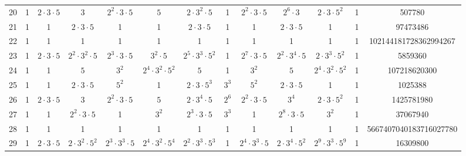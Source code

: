 \begin{table}
\begin{center}
\begin{adjustbox}{max width=\textwidth}
\begin{tabular}{|c|ccccccccccc|c|}
20& 1& $2\cdot 3\cdot 5$& $3$& $2^2\cdot 3\cdot 5$& $5$& $2\cdot 3^2\cdot 5$&1& $2^2\cdot 3\cdot 5$& $2^6\cdot 3$& $2\cdot 3\cdot 5^2$&1&507780\\
21& 1&1& $2\cdot 3\cdot 5$&1&1& $2\cdot 3\cdot 5$&1&1& $2\cdot 3\cdot 5$&1&1&97473486\\
22& 1&1&1&1&1&1&1&1&1&1&1&102144181728362994267\\
23& 1& $2\cdot 3\cdot 5$& $2^2\cdot 3^2\cdot 5$& $2^3\cdot 3\cdot 5$& $3^2\cdot 5$& $2^5\cdot 3^3\cdot 5^2$&1& $2^7\cdot 3\cdot 5$& $2^2\cdot 3^4\cdot 5$& $2\cdot 3^3\cdot 5^2$&1&5859360\\
24& 1&1& $5$& $3^2$& $2^4\cdot 3^2\cdot 5^2$& $5$&1& $3^2$& $5$& $2^4\cdot 3^2\cdot 5^2$&1&107218620300\\
25& 1&1& $2\cdot 3\cdot 5$& $5^2$&1& $2\cdot 3\cdot 5^3$& $3^3$& $5^2$& $2\cdot 3\cdot 5$&1&1&1025388\\
26& 1& $2\cdot 3\cdot 5$& $3$& $2^2\cdot 3\cdot 5$& $5$& $2\cdot 3^4\cdot 5$& $2^6$& $2^2\cdot 3\cdot 5$& $3^4$& $2\cdot 3\cdot 5^2$&1&1425781980\\
27& 1&1& $2^2\cdot 3\cdot 5$&1& $3^2$& $2^3\cdot 3\cdot 5$& $3^3$&1& $2^8\cdot 3\cdot 5$& $3^2$&1&37067940\\
28& 1&1&1&1&1&1&1&1&1&1&1&5667407040183716027780\\
29& 1& $2\cdot 3\cdot 5$& $2\cdot 3^2\cdot 5^2$& $2^3\cdot 3^3\cdot 5$& $2^4\cdot 3^2\cdot 5^4$& $2^2\cdot 3^3\cdot 5^3$&1& $2^4\cdot 3^3\cdot 5$& $2\cdot 3^4\cdot 5^2$& $2^9\cdot 3^3\cdot 5^9$&1&16309800\\

\end{tabular}
\end{adjustbox}
\end{center}
\end{table}
